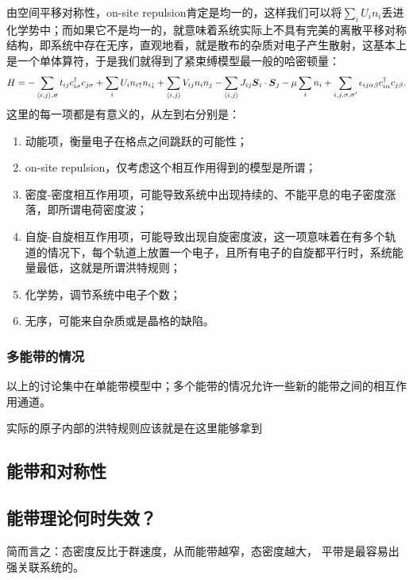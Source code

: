 由空间平移对称性，on-site repulsion肯定是均一的，这样我们可以将$\sum_i U_i n_i$丢进化学势中；而如果它不是均一的，就意味着系统实际上不具有完美的离散平移对称结构，即系统中存在无序，直观地看，就是散布的杂质对电子产生散射，这基本上是一个单体算符，于是我们就得到了紧束缚模型最一般的哈密顿量：
\begin{equation}
    H = - \sum_{\langle i, j \rangle, \sigma} t_{ij} c^\dagger_{i \sigma} c_{j \sigma} 
    + \sum_{i} U_i n_{i \uparrow} n_{i \downarrow} 
    + \sum_{\langle i, j \rangle} V_{ij} n_i n_j - \sum_{\langle i, j \rangle} J_{i j} \vb*{S}_{i} \cdot \vb*{S}_j 
    - \mu \sum_i n_i + \sum_{i, j, \sigma, \sigma'} \epsilon_{ij\alpha \beta} c^\dagger_{i \alpha} c_{j \beta}.  
\end{equation}
这里的每一项都是有意义的，从左到右分别是：
\begin{enumerate}
    \item 动能项，衡量电子在格点之间跳跃的可能性；
    \item on-site repulsion，仅考虑这个相互作用得到的模型是所谓；
    \item 密度-密度相互作用项，可能导致系统中出现持续的、不能平息的电子密度涨落，即所谓电荷密度波；
    \item 自旋-自旋相互作用项，可能导致出现自旋密度波，这一项意味着在有多个轨道的情况下，每个轨道上放置一个电子，且所有电子的自旋都平行时，系统能量最低，这就是所谓洪特规则；
    \item 化学势，调节系统中电子个数；
    \item 无序，可能来自杂质或是晶格的缺陷。
\end{enumerate}

\subsubsection{多能带的情况}

以上的讨论集中在单能带模型中；多个能带的情况允许一些新的能带之间的相互作用通道。

实际的原子内部的洪特规则应该就是在这里能够拿到

\subsection{能带和对称性}


\subsection{能带理论何时失效？}

简而言之：态密度反比于群速度，从而能带越窄，态密度越大，
平带是最容易出强关联系统的。
